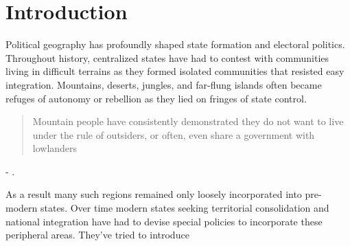 \section{Introduction}
Political geography has profoundly shaped state formation and electoral politics. Throughout history, centralized states have had to contest with communities living in difficult terrains as they formed isolated communities that resisted easy integration. Mountains, deserts, jungles, and far-flung islands often became refuges of autonomy or rebellion as they lied on fringes of state control. \begin{quote} Mountain people have consistently demonstrated they do not want to live under the rule of outsiders, or often, even share a government with lowlanders\end{quote} 

\hspace*{\fill} - \cite{Hammes2017}. 

As a result many such regions remained only loosely incorporated into pre-modern states. Over time modern states seeking territorial consolidation and national integration have had to devise special policies to incorporate these peripheral areas. They've tried to introduce 